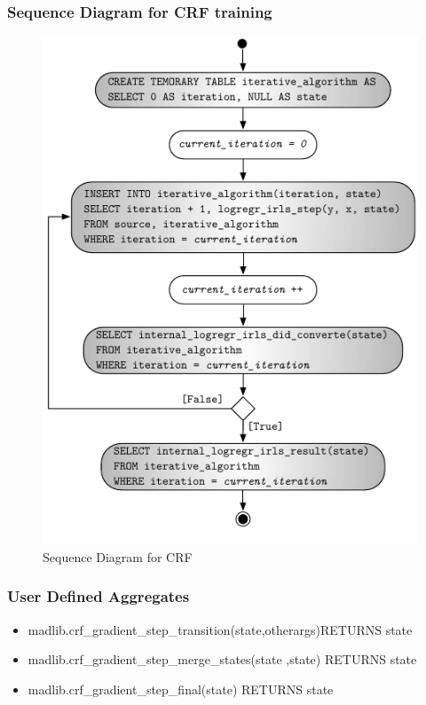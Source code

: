 \documentclass{beamer}
\begin{document}
\begin{frame}
  \frametitle{Sequence Diagram for CRF training}
\begin{figure}
	\centering
	\includegraphics[scale=0.66]{LogisticRegression}
	\caption{Sequence Diagram for CRF}
	\label{fig:log-reg-driver}
\end{figure}
\end{frame}

\begin{frame}
  \frametitle{User Defined Aggregates}
  \begin{itemize}
\item madlib.crf\_gradient\_step\_transition(state,otherargs)RETURNS state


\item madlib.crf\_gradient\_step\_merge\_states(state ,state) RETURNS state


\item madlib.crf\_gradient\_step\_final(state) RETURNS state
  \end{itemize}
\end{frame}
\end{document}
